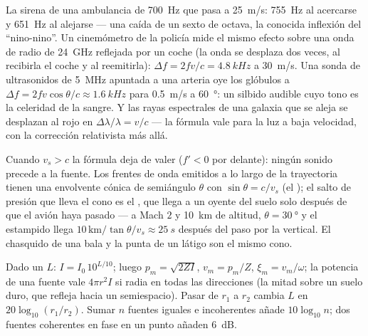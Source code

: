 \begin{example}\label{ex:b2:sound-waves:dopplerex}
La sirena de una ambulancia de \qty{700}{Hz} que pasa a \qty{25}{m/s}: \qty{755}{Hz}
al acercarse y \qty{651}{Hz} al alejarse --- una caída de un sexto de
octava, la conocida inflexión del ``nino-nino''. Un cinemómetro de la
policía mide el mismo efecto sobre una onda de radio de \qty{24}{GHz}
reflejada por un coche (la onda se desplaza dos veces, al recibirla el
coche y al reemitirla): $\Delta f = 2fv/c =
\qty{4.8}{kHz}$ a \qty{30}{m/s}. Una sonda de ultrasonidos de \qty{5}{MHz} apuntada a
una arteria oye los glóbulos a $\Delta f = 2fv\cos\theta/c \approx \qty{1.6}{kHz}$
para \qty{0.5}{m/s} a \qty{60}{\degree}: un silbido audible cuyo tono es la
celeridad de la sangre. Y las rayas espectrales de una galaxia que se aleja
se desplazan al rojo en $\Delta\lambda/\lambda = v/c$ --- la fórmula vale para la luz a baja velocidad,
con la corrección relativista más allá.
\end{example}

\begin{remark}[Supersónico]\label{rem:b2:sound-waves:mach}
Cuando $v_s > c$ la fórmula deja de valer ($f' < 0$ por delante): ningún
sonido precede a la fuente. Los frentes de onda emitidos a lo largo de la
trayectoria tienen una envolvente cónica de semiángulo $\theta$ con $\sin\theta = c/v_s$ (el \emph{});
el salto de presión que lleva el cono es el , que llega a
un oyente del suelo solo después de que el avión haya pasado --- a
Mach $2$ y \qty{10}{km} de altitud, $\theta = \qty{30}{\degree}$ y el estampido
llega $10\,\text{km}/\tan\theta/v_s \approx \qty{25}{s}$ después del paso por
la vertical. El chasquido de una bala y la punta de un látigo son el mismo cono.
\end{remark}

\begin{method}\label{met:b2:sound-waves:method}
Dado un  $L$: $I = I_0\,10^{L/10}$; luego $p_m = \sqrt{2ZI}$,
$v_m = p_m/Z$, $\xi_m = v_m/\omega$; la potencia de una fuente vale $4\pi r^2I$ si
radia en todas las direcciones (la mitad sobre un suelo duro, que refleja
hacia un semiespacio). Pasar de $r_1$ a $r_2$ cambia $L$ en
$20\log_{10}(r_1/r_2)$. Sumar $n$ fuentes iguales e incoherentes añade
$10\log_{10}n$; dos fuentes coherentes en fase en un punto añaden \qty{6}{dB}.
\end{method}

